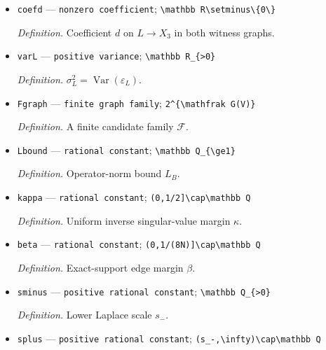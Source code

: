 \documentclass{article}
\begin{document}
\begin{itemize}
  \par\smallskip\noindent\emph{Definition.} Coefficient \(c\) on \(L\to X_1\) in \(G_\star\).
  \item \texttt{coefd} --- \texttt{nonzero coefficient}; \texttt{\textbackslash{}\allowbreak{}mathbb R\textbackslash{}\allowbreak{}setminus\textbackslash{}\allowbreak{}\{0\textbackslash{}\allowbreak{}\}\allowbreak{}}
  \par\smallskip\noindent\emph{Definition.} Coefficient \(d\) on \(L\to X_3\) in both witness graphs.
  \item \texttt{varL} --- \texttt{positive variance}; \texttt{\textbackslash{}\allowbreak{}mathbb R\_\allowbreak{}\{>0\}\allowbreak{}}
  \par\smallskip\noindent\emph{Definition.} \(\sigma_L^2=\operatorname{Var}(\varepsilon_L)\).
  \item \texttt{Fgraph} --- \texttt{finite graph family}; \texttt{2\textasciicircum{}\{\textbackslash{}\allowbreak{}mathfrak G(V)\}\allowbreak{}}
  \par\smallskip\noindent\emph{Definition.} A finite candidate family \(\mathcal F\).
  \item \texttt{Lbound} --- \texttt{rational constant}; \texttt{\textbackslash{}\allowbreak{}mathbb Q\_\allowbreak{}\{\textbackslash{}\allowbreak{}ge1\}\allowbreak{}}
  \par\smallskip\noindent\emph{Definition.} Operator-norm bound \(L_B\).
  \item \texttt{kappa} --- \texttt{rational constant}; \texttt{(0,\allowbreak{}1/\allowbreak{}2]\textbackslash{}\allowbreak{}cap\textbackslash{}\allowbreak{}mathbb Q}
  \par\smallskip\noindent\emph{Definition.} Uniform inverse singular-value margin \(\kappa\).
  \item \texttt{beta} --- \texttt{rational constant}; \texttt{(0,\allowbreak{}1/\allowbreak{}(8N)]\textbackslash{}\allowbreak{}cap\textbackslash{}\allowbreak{}mathbb Q}
  \par\smallskip\noindent\emph{Definition.} Exact-support edge margin \(\beta\).
  \item \texttt{sminus} --- \texttt{positive rational constant}; \texttt{\textbackslash{}\allowbreak{}mathbb Q\_\allowbreak{}\{>0\}\allowbreak{}}
  \par\smallskip\noindent\emph{Definition.} Lower Laplace scale \(s_-\).
  \item \texttt{splus} --- \texttt{positive rational constant}; \texttt{(s\_\allowbreak{}-\allowbreak{},\allowbreak{}\textbackslash{}\allowbreak{}infty)\textbackslash{}\allowbreak{}cap\textbackslash{}\allowbreak{}mathbb Q}

\end{itemize}
\end{document}

